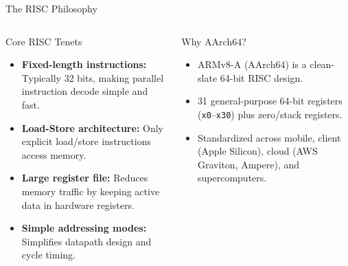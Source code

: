 \documentclass[aspectratio=169,11pt]{beamer}
\newcommand{\key}[1]{\textbf{#1}}
\newcommand{\bits}[1]{\texttt{#1}}
\begin{document}
\begin{frame}{The RISC Philosophy}

\begin{columns}[T,onlytextwidth]

\begin{block}{Core RISC Tenets}
\begin{itemize}
  \item \key{Fixed-length instructions:} Typically 32 bits, making parallel instruction decode simple and fast.
  \item \key{Load-Store architecture:} Only explicit load/store instructions access memory.
  \item \key{Large register file:} Reduces memory traffic by keeping active data in hardware registers.
  \item \key{Simple addressing modes:} Simplifies datapath design and cycle timing.
\end{itemize}
\end{block}

\begin{block}{Why AArch64?}
\begin{itemize}
  \item ARMv8-A (AArch64) is a clean-slate 64-bit RISC design.
  \item 31 general-purpose 64-bit registers (\bits{x0}--\bits{x30}) plus zero/stack registers.
  \item Standardized across mobile, client (Apple Silicon), cloud (AWS Graviton, Ampere), and supercomputers.
\end{itemize}
\end{block}

\end{columns}

\end{frame}

\end{document}
